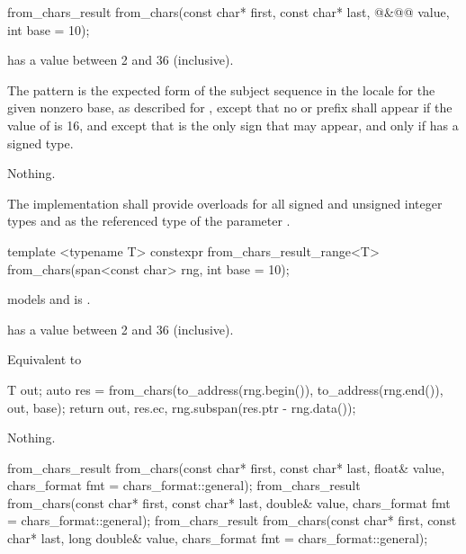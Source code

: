 \documentclass{wg21}
\begin{document}
%
\begin{itemdecl}
from_chars_result from_chars(const char* first, const char* last,
@\seebelow@&@\itcorr[-1]@ value, int base = 10);
\end{itemdecl}

\begin{itemdescr}
\pnum
\expects
{} has a value between 2 and 36 (inclusive).

\pnum
\effects
The pattern is the expected form of the subject sequence
in the  locale
for the given nonzero base,
as described for ,
except that no  or  prefix shall appear
if the value of  is 16,
and except that 
is the only sign that may appear,
and only if  has a signed type.

\pnum
\throws
Nothing.

\pnum
\remarks
The implementation shall provide overloads
for all signed and unsigned integer types
and 
as the referenced type of the parameter .
\end{itemdescr}

\begin{addedblock}
%
\begin{itemdecl}
template <typename T>
constexpr from_chars_result_range<T> from_chars(span<const char> rng, int base = 10);
\end{itemdecl}

\begin{itemdescr}

\constraints {} models  and  is .

\pnum
\expects
{} has a value between 2 and 36 (inclusive).

\pnum
\effects Equivalent to
\begin{codeblock}
T out;
auto res = from_chars(to_address(rng.begin()), to_address(rng.end()), out, base);
return {out, res.ec, rng.subspan(res.ptr - rng.data())};
\end{codeblock}

\pnum
\throws
Nothing.

\pnum
\end{itemdescr}

\end{addedblock}

%
\begin{itemdecl}
from_chars_result from_chars(const char* first, const char* last, float& value,
chars_format fmt = chars_format::general);
from_chars_result from_chars(const char* first, const char* last, double& value,
chars_format fmt = chars_format::general);
from_chars_result from_chars(const char* first, const char* last, long double& value,
chars_format fmt = chars_format::general);
\end{itemdecl}
\end{document}
